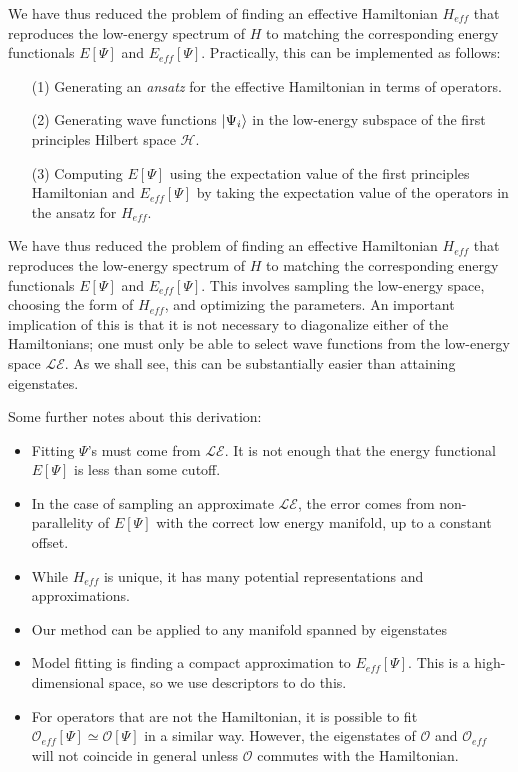 We have thus reduced the problem of finding an effective Hamiltonian $H_{eff}$ that reproduces the low-energy spectrum of $H$ to matching the corresponding energy functionals $E[\Psi]$ and $E_{eff}[\Psi]$. 
Practically, this can be implemented as follows: 
\begin{itemize}
\item [(1)]Generating an \textit{ansatz} for the effective Hamiltonian in terms of operators. 
\item [(2)]Generating wave functions $\ket{\Psi_i}$ in the low-energy subspace of the first principles Hilbert space ${\mathcal H}$.
\item [(3)]Computing $E[\Psi]$ using the expectation value of the first principles Hamiltonian and $E_{eff}[\Psi]$ by taking the expectation value of the operators in the ansatz for $H_{eff}$. 
\end{itemize}
We have thus reduced the problem of finding an effective Hamiltonian $H_{eff}$ that reproduces the low-energy spectrum of $H$ to matching the corresponding energy functionals $E[\Psi]$ and $E_{eff}[\Psi]$. 
This involves sampling the low-energy space, choosing the form of $H_{eff}$, and optimizing the parameters.
An important implication of this is that it is not necessary to diagonalize either of the Hamiltonians; one must only be able to select wave functions from the low-energy space $\mathcal{LE}$.
As we shall see, this can be substantially easier than attaining eigenstates.

Some further notes about this derivation:
\begin{itemize}
\item Fitting $\Psi$'s must come from $\mathcal{LE}$. It is not enough that the energy functional $E[\Psi]$ is less than some cutoff.
\item In the case of sampling an approximate $\mathcal{LE}$, the error comes from non-parallelity of $E[\Psi]$ with the correct low energy manifold, up to a constant offset.
\item While $H_{eff}$ is unique, it has many potential representations and approximations. 
\item Our method can be applied to any manifold spanned by eigenstates
\item Model fitting is finding a compact approximation to $E_{eff}[\Psi]$. This is a high-dimensional space, so we use descriptors to do this.	
\item For operators that are not the Hamiltonian, it is possible to fit $\mathcal{O}_{eff}[\Psi] \simeq {\mathcal O}[\Psi]$ in a similar way. However, the eigenstates of ${\mathcal O}$ and ${\mathcal O}_{eff}$ will not coincide in general unless $\mathcal{O}$ commutes with the Hamiltonian.
\end{itemize}


